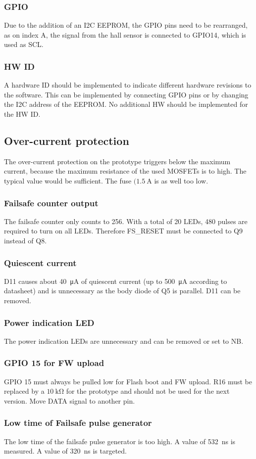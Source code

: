 \subsubsection{GPIO}
Due to the addition of an \ac{I2C} \ac{EEPROM}, the \ac{GPIO} pins need to be rearranged, as on index A, the signal from the hall sensor is connected to GPIO14, which is used as SCL. 

\subsubsection{HW ID}
A hardware ID should be implemented to indicate different hardware revisions to the software. This can be implemented by connecting GPIO pins or by changing the I2C address of the EEPROM. No additional HW should be implemented for the HW ID. 

\subsection{Over-current protection}
The over-current protection on the prototype triggers below the maximum current, because the maximum resistance of the used MOSFETs is to high. The typical value would be sufficient. The fuse $(\SI{1.5}{\A}$ is as well too low. 

\subsubsection{Failsafe counter output}
The failsafe counter only counts to 256. With a total of 20 \acp{LED}, 480 pulses are required to turn on all \acp{LED}. Therefore FS\_RESET must be connected to Q9 instead of Q8. 

\subsubsection{Quiescent current}
D11 causes about \SI{40}{\micro\ampere} of quiescent current (up to \SI{500}{\micro\ampere} according to datasheet) and is unnecessary as the body diode of Q5 is parallel. D11 can be removed. 

\subsubsection{Power indication LED}
The power indication \acp{LED} are unnecessary and can be removed or set to NB. 

\subsubsection{GPIO 15 for FW upload}
GPIO 15 must always be pulled low for Flash boot and FW upload. R16 must be replaced by a $\SI{10}{\kilo\ohm}$ for the prototype and should not be used for the next version. Move DATA signal to another pin. 

\subsubsection{Low time of Failsafe pulse generator}
The low time of the failsafe pulse generator is too high. A value of \SI{532}{\nano\s} is measured. A value of \SI{320}{\nano\s} is targeted. 

